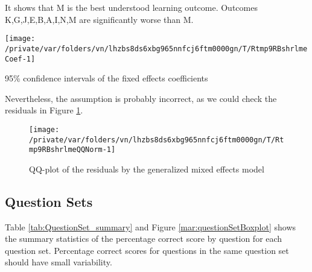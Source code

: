 \documentclass[12pt,english,nohyper]{tufte-handout}\usepackage[]{graphicx}\usepackage[]{color}
\newenvironment{knitrout}{}{} %
\begin{document}
It shows that M is the best understood learning outcome.
Outcomes K,G,J,E,B,A,I,N,M are
significantly worse than M.



\begin{knitrout}
\color{fgcolor}\begin{marginfigure}
\texttt{[image: /private/var/folders/vn/lhzbs8ds6xbg965nnfcj6ftm0000gn/T/Rtmp9RBshrlmeCoef-1]} \caption[95\% confidence intervals of the fixed effects coefficients]{95\% confidence intervals of the fixed effects coefficients}\label{mar:lmeCoef}
\end{marginfigure}


\end{knitrout}

Nevertheless, the assumption is probably incorrect, as we could check the residuals in
Figure \ref{fig:lmeQQNorm}.

\begin{knitrout}
\color{fgcolor}\begin{figure}

{\centering \texttt{[image: /private/var/folders/vn/lhzbs8ds6xbg965nnfcj6ftm0000gn/T/Rtmp9RBshrlmeQQNorm-1]} 

}

\caption[QQ-plot of the residuals by the generalized mixed effects model]{QQ-plot of the residuals by the generalized mixed effects model}\label{fig:lmeQQNorm}
\end{figure}


\end{knitrout}

\clearpage
\newpage{}
\subsection{Question Sets}

Table \ref{tab:QuestionSet_summary} and Figure \ref{mar:questionSetBoxplot} shows the summary statistics of the percentage correct score by question for each question set. Percentage correct scores for questions in the same question set should have small variability.
\end{document}

